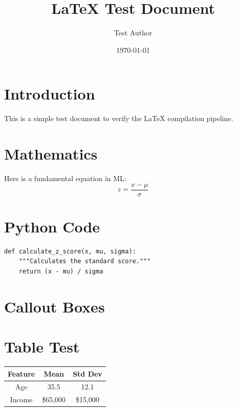\documentclass[11pt,a4paper]{article}
\title{LaTeX Test Document}
\author{Test Author}
\date{\today}
\begin{document}
\maketitle

\section{Introduction}
This is a simple test document to verify the \LaTeX{} compilation pipeline.

\section{Mathematics}
Here is a fundamental equation in ML:
\[ z = \frac{x-\mu}{\sigma} \]

\section{Python Code}
\begin{lstlisting}
def calculate_z_score(x, mu, sigma):
    """Calculates the standard score."""
    return (x - mu) / sigma
\end{lstlisting}

\section{Callout Boxes}

\section{Table Test}
\begin{center}
\begin{tabular}{|c|c|c|}
\hline
\textbf{Feature} & \textbf{Mean} & \textbf{Std Dev} \\
\hline
Age & 35.5 & 12.1 \\
Income & \$65,000 & \$15,000 \\
\hline
\end{tabular}
\end{center}
\end{document}
